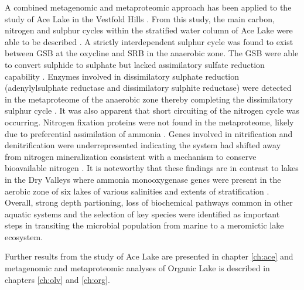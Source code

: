 A combined metagenomic and metaproteomic approach has been applied to the study  of Ace Lake in the Vestfold Hills \cite{Ng2010a, Ng2010b, Lauro2011}. 
From this study, the main carbon, nitrogen and sulphur cycles within the stratified water column of Ace Lake were able to be described \cite{Lauro2011}.
A strictly interdependent sulphur cycle was found to exist between \ac{GSB} at the oxycline and \ac{SRB} in the anaerobic zone.
The \ac{GSB} were able to convert sulphide to sulphate but lacked assimilatory sulfate reduction capability \cite{Ng2010a, Ng2010b, Lauro2011}. 
Enzymes involved in dissimilatory sulphate reduction (adenylylsulphate reductase and dissimilatory sulphite reductase) were detected in the metaproteome of the anaerobic zone thereby completing the dissimilatory sulphur cycle \cite{Ng2010a, Ng2010b}.
It was also apparent that short circuiting of the nitrogen cycle was occurring. 
Nitrogen fixation proteins were not found in the metaproteome, likely due to preferential assimilation of ammonia \cite{Ng2010a, Ng2010b, Lauro2011}.  
Genes involved in nitrification and denitrification were underrepresented indicating the system had shifted away from nitrogen mineralization consistent with a mechanism to conserve bioavailable nitrogen \cite{Lauro2011}. 
It is noteworthy that these findings are in contrast to lakes in the Dry Valleys where ammonia monooxygenase genes were present in the aerobic zone of six lakes of various salinities and extents of stratification \cite{Voytek1999}.
Overall, strong depth partioning, loss of biochemical pathways common in other aquatic systems and the selection of key species were identified as important steps in transiting the microbial population from marine to a meromictic lake ecosystem.

Further results from the study of Ace Lake are presented in chapter \ref{ch:ace} and metagenomic and metaproteomic analyses of Organic Lake is described in chapters \ref{ch:olv} and \ref{ch:org}.

